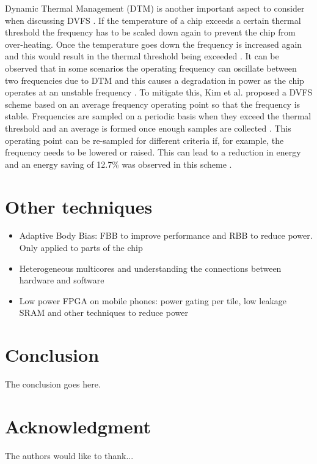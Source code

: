 \documentclass[journal]{IEEEtran}
\begin{document}
Dynamic Thermal Management (DTM) is another important aspect to consider when discussing DVFS \cite{TempDVFS}. If the temperature of a chip exceeds a certain thermal threshold the frequency has to be scaled down again to prevent the chip from over-heating. Once the temperature goes down the frequency is increased again and this would result in the thermal threshold being exceeded \cite{TempDVFS}. It can be observed that in some scenarios the operating frequency can oscillate between two frequencies due to DTM and this causes a degradation in power as the chip operates at an unstable frequency \cite{TempDVFS}. To mitigate this, Kim et al. \cite{TempDVFS} proposed a DVFS scheme based on an average frequency operating point so that the frequency is stable. Frequencies are sampled on a periodic basis when they exceed the thermal threshold and an average is formed once enough samples are collected \cite{TempDVFS}. This operating point can be re-sampled for different criteria if, for example, the frequency needs to be lowered or raised. This can lead to a reduction in energy and an energy saving of 12.7\% was observed in this scheme \cite{TempDVFS}.


\section{Other techniques}
\begin{itemize}
	\item Adaptive Body Bias: FBB to improve performance and RBB to reduce power. Only applied to parts of the chip \cite{ABB}
	\item Heterogeneous multicores and understanding the connections between hardware and software \cite{HD/SF} \cite{MultiCores}
	\item Low power FPGA on mobile phones: power gating per tile, low leakage SRAM and other techniques to reduce power \cite{FPGA}
\end{itemize}

\section{Conclusion}
The conclusion goes here.

\appendices

\section*{Acknowledgment}
The authors would like to thank...


\ifCLASSOPTIONcaptionsoff
  \newpage
\fi




\end{document}
